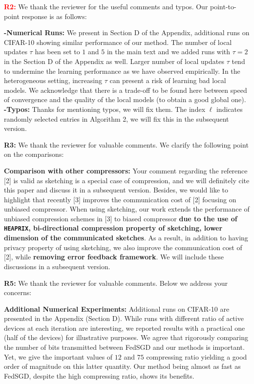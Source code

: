 \documentclass{article}
\begin{document}
\textbf{\textcolor{red}{R2:}} We thank the reviewer for the useful comments and typos. Our point-to-point response is as follows:\vspace{-5pt}

\textbf{-Numerical Runs:} We present in Section D of the Appendix, additional runs on CIFAR-10 showing similar performance of our method. The number of local updates $\tau$ has been set to $1$ and $5$ in the main text and we added runs with $\tau = 2$ in the Section D of the Appendix as well. Larger number of local updates $\tau$ tend to undermine the learning performance as we have observed empirically. In the heterogeneous setting, increasing $\tau$ can present a risk of learning bad local models. We acknowledge that there is a trade-off to be found here between speed of convergence and the quality of the local models (to obtain a good global one). \textbf{-Typos:} Thanks for mentioning typos, we will fix them. The index $\ell$ indicates randomly selected entries in Algorithm 2, we will fix this in the subsequent version.  


\textbf{\textcolor{yellow!50!black}{R3:}} We thank the reviewer for valuable comments. We clarify the following point on the comparisons:\vspace{-5pt}

\textbf{Comparison with other compressors:} Your comment regarding the reference [2] is valid as sketching is a special case of compression, and we will definitely cite this paper and discuss it in a subsequent version. Besides, we would like to highlight that recently [3] improves the communication cost of [2] focusing on unbiased compressor. 
When using sketching, our work extends the performance of unbiased compression schemes in [3] to biased compressor \textbf{due to the use of \texttt{HEAPRIX}, bi-directional compression property of sketching, lower dimension of the communicated sketches}.  
As a result, in addition to having privacy property of using sketching, we also improve the communication cost of [2], while \textbf{removing error feedback framework}. We will include these discussions in a subsequent version.    



\textbf{\textcolor{green!50!black}{R5:}} We thank the reviewer for valuable comments. Below we address your concerns:\vspace{-5pt}

\textbf{Additional Numerical Experiments:} Additional runs on CIFAR-10 are presented in the Appendix (Section D). While runs with different ratio of active devices at each iteration are interesting, we reported results with a practical one (half of the devices) for illustrative purposes.
We agree that rigorously comparing the number of bits transmitted between FedSGD and our methods is important.
Yet, we give the important values of $12$ and $75$ compressing ratio yielding a good order of magnitude on this latter quantity. 
Our method being almost as fast as FedSGD, despite the high compressing ratio, shows its benefits.
\end{document}
